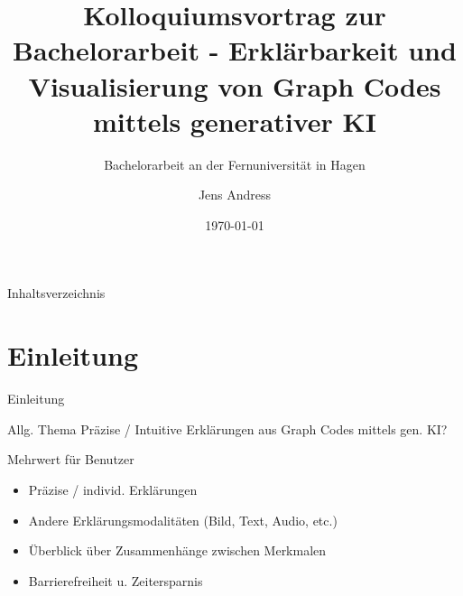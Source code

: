 \documentclass[t]{beamer}
\title{Kolloquiumsvortrag zur Bachelorarbeit - Erklärbarkeit und Visualisierung von Graph Codes mittels generativer KI}
\subtitle{Bachelorarbeit an der Fernuniversität in Hagen}
\author{Jens Andress}
\date{\today}
\institute{Lehrgebiet Multimedia und Internetanwendungen}
\begin{document}
\maketitle

\begin{frame}{Inhaltsverzeichnis}
  \tableofcontents

\end{frame}

\section{Einleitung}


\begin{frame}{Einleitung}

  \begin{exampleblock}{Allg. Thema}
    Präzise / Intuitive Erklärungen aus Graph Codes mittels gen. KI?
  \end{exampleblock}

  \begin{block}{Mehrwert für Benutzer}
    \begin{itemize}
      \item Präzise / individ. Erklärungen
      \item Andere Erklärungsmodalitäten (Bild, Text, Audio, etc.)
      \item Überblick über Zusammenhänge zwischen Merkmalen
      \item Barrierefreiheit u. Zeitersparnis
    \end{itemize}
  \end{block}

\end{frame}
\end{document}
